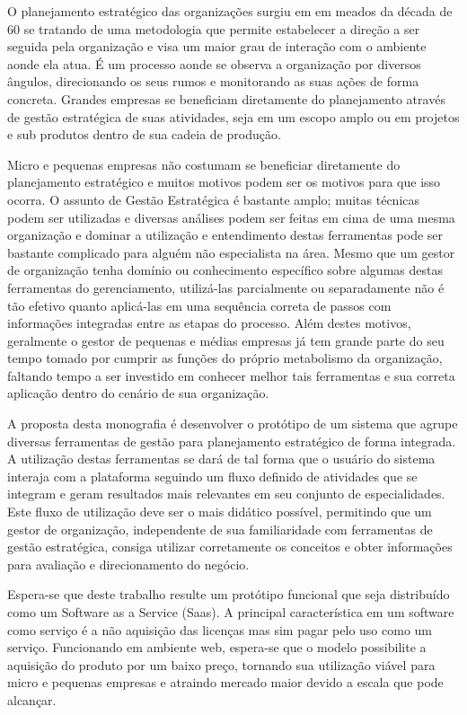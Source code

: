 \documentclass{abnt}
\begin{document}
O planejamento estratégico das organizações surgiu em em meados da década de 60
se tratando de uma metodologia que permite estabelecer a direção a ser seguida
pela organização e visa um maior grau de interação com o ambiente aonde ela
atua. É um processo aonde se observa a organização por diversos ângulos,
direcionando os seus rumos e monitorando as suas ações de forma concreta.
Grandes empresas se beneficiam diretamente do planejamento através de gestão
estratégica de suas atividades, seja em um escopo amplo ou em projetos e sub
produtos dentro de sua cadeia de produção.

Micro e pequenas empresas não costumam se beneficiar diretamente do planejamento
estratégico e muitos motivos podem ser os motivos para que isso ocorra. O
assunto de Gestão Estratégica é bastante amplo; muitas técnicas podem ser
utilizadas e diversas análises podem ser feitas em cima de uma mesma organização
e dominar a utilização e entendimento destas ferramentas pode ser bastante
complicado para alguém não especialista na área. Mesmo que um gestor de
organização tenha domínio ou conhecimento específico sobre algumas destas
ferramentas do gerenciamento, utilizá-las parcialmente ou separadamente não é
tão efetivo quanto aplicá-las em uma sequência correta de passos com informações
integradas entre as etapas do processo. Além destes motivos, geralmente o gestor
de pequenas e médias empresas já tem grande parte do seu tempo tomado por
cumprir as funções do próprio metabolismo da organização, faltando tempo a ser
investido em conhecer melhor tais ferramentas e sua correta aplicação dentro do
cenário de sua organização.

A proposta desta monografia é desenvolver o protótipo de um sistema que agrupe
diversas ferramentas de gestão para planejamento estratégico de forma integrada.
A utilização destas ferramentas se dará de tal forma que o usuário do sistema
interaja com a plataforma seguindo um fluxo definido de atividades que se
integram e geram resultados mais relevantes em seu conjunto de especialidades.
Este fluxo de utilização deve ser o mais didático possível, permitindo que um
gestor de organização, independente de sua familiaridade com ferramentas de
gestão estratégica, consiga utilizar corretamente os conceitos e obter
informações para avaliação e direcionamento do negócio.

Espera-se que deste trabalho resulte um protótipo funcional que seja distribuído
como um Software as a Service (Saas)\cite{Turner2003}. A principal
característica em um software como serviço é a não aquisição das licenças mas
sim pagar pelo uso como um serviço. Funcionando em ambiente web, espera-se que
o modelo possibilite a aquisição do produto por um baixo preço, tornando sua
utilização viável para micro e pequenas empresas e atraindo mercado maior devido
a escala que pode alcançar.\\
\end{document}
